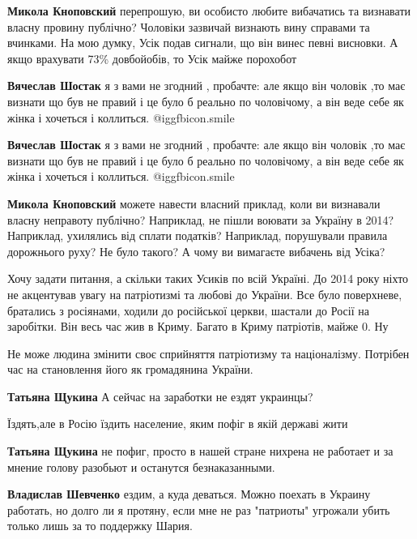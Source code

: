 \begin{itemize}
\begin{itemize}
\textbf{Микола Кноповский} перепрошую, ви особисто любите вибачатись та визнавати власну провину публічно? Чоловіки зазвичай визнають вину справами та вчинками.
На мою думку, Усік подав сигнали, що він винес певні висновки. А якщо врахувати 73\% довбойобів, то Усік майже порохобот

\textbf{Вячеслав Шостак} я з вами не згодний , пробачте: але якщо він чоловік ,то має визнати що був не правий і це було б реально по чоловічому, а він веде себе як жінка і хочеться і коллиться. @igg{fbicon.smile} 

\textbf{Вячеслав Шостак} я з вами не згодний , пробачте: але якщо він чоловік ,то має визнати що був не правий і це було б реально по чоловічому, а він веде себе як жінка і хочеться і коллиться. @igg{fbicon.smile} 

\textbf{Микола Кноповский} можете навести власний приклад, коли ви визнавали власну неправоту публічно?
Наприклад, не пішли воювати за Україну в 2014? Наприклад, ухилялись від сплати податків?
Наприклад, порушували правила дорожнього руху?
Не було такого? А чому ви вимагаєте вибачень від Усіка?

\end{itemize} %


Хочу задати питання, а скільки таких Усиків по всій Україні. До 2014 року ніхто
не акцентував увагу на патріотизмі та любові до України. Все було поверхневе,
братались з росіянами, ходили до російської церкви, шастали до Росії на
заробітки. Він весь час жив в Криму. Багато в Криму патріотів, майже 0. Ну

Не може людина змінити своє сприйняття патріотизму та націоналізму. Потрібен
час на становлення його як громадянина України.

\begin{itemize} %
\textbf{Татьяна Щукина} А сейчас на заработки не ездят украинцы?

Їздять,але в Росію їздить население, яким пофіг в якій державі жити

\textbf{Татьяна Щукина} не пофиг, просто в нашей стране нихрена не работает и за мнение голову разобьют и останутся безнаказанными.

\textbf{Владислав Шевченко} ездим, а куда деваться. Можно поехать в Украину работать, но долго ли я протяну, если мне не раз "патриоты" угрожали убить только лишь за то поддержку Шария.


\end{itemize}
\end{itemize}

